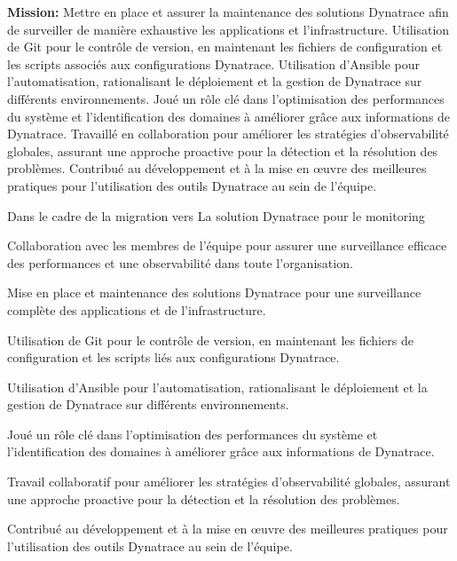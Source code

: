 \begin{cventries}
{  \textbf{Mission:} Mettre en place et assurer la maintenance des solutions Dynatrace afin de surveiller de manière exhaustive les applications et l'infrastructure. Utilisation de Git pour le contrôle de version, en maintenant les fichiers de configuration et les scripts associés aux configurations Dynatrace. Utilisation d'Ansible pour l'automatisation, rationalisant le déploiement et la gestion de Dynatrace sur différents environnements. Joué un rôle clé dans l'optimisation des performances du système et l'identification des domaines à améliorer grâce aux informations de Dynatrace. Travaillé en collaboration pour améliorer les stratégies d'observabilité globales, assurant une approche proactive pour la détection et la résolution des problèmes. Contribué au développement et à la mise en œuvre des meilleures pratiques pour l'utilisation des outils Dynatrace au sein de l'équipe.
}
{
  \begin{cvitems}
    \item {Dans le cadre de la migration vers La solution Dynatrace pour le monitoring }
    \item {Collaboration avec les membres de l'équipe pour assurer une surveillance efficace des performances et une observabilité dans toute l'organisation.}
    \item {Mise en place et maintenance des solutions Dynatrace pour une surveillance complète des applications et de l'infrastructure.}
    \item {Utilisation de Git pour le contrôle de version, en maintenant les fichiers de configuration et les scripts liés aux configurations Dynatrace.}
    \item {Utilisation d'Ansible pour l'automatisation, rationalisant le déploiement et la gestion de Dynatrace sur différents environnements.}
    \item {Joué un rôle clé dans l'optimisation des performances du système et l'identification des domaines à améliorer grâce aux informations de Dynatrace.}
    \item {Travail collaboratif pour améliorer les stratégies d'observabilité globales, assurant une approche proactive pour la détection et la résolution des problèmes.}
    \item {Contribué au développement et à la mise en œuvre des meilleures pratiques pour l'utilisation des outils Dynatrace au sein de l'équipe.}
  \end{cvitems}
}


\end{cventries}
